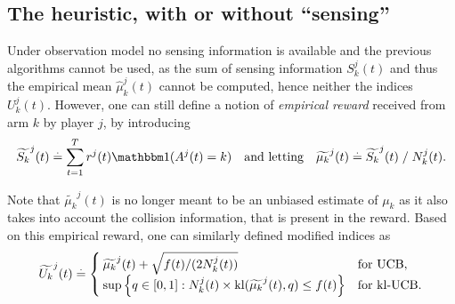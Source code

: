 \subsection{The \Selfish{} heuristic, with or without ``sensing''}
\label{sub:5:Selfish}

Under observation model \modeltrois{} no sensing information is available and the previous algorithms cannot be used, as the sum of sensing information $S_k^j(t)$ and thus the empirical mean $\widehat{\mu}_k^j(t)$ cannot be computed, hence neither the indices $U_k^j(t)$. However, one can still define a notion of \emph{empirical reward} received from arm $k$ by player $j$, by introducing
%
\begin{equation}
  \widetilde{S_k}^j(t) \eqdef \sum_{t=1}^T r^j(t) \indic(A^j(t) = k)
  \ \ \ \text{and letting} \ \ \ \widetilde{\mu_k}^j(t) \eqdef \widetilde{S_k}^j(t) \;/\; N_k^j(t).
\end{equation}

Note that $\widetilde{\mu_k}^j(t)$ is no longer meant to be an unbiased estimate of $\mu_k$ as it also takes into account the collision information, that is present in the reward. Based on this empirical reward, one can similarly defined modified indices as
%
\begin{equation}\label{eq:5:indexTilde}
  \widetilde{U_k}^j(t) \overset{.}{=} \begin{cases}
      \widetilde{\mu_k}^j(t)  + \sqrt{  f(t) / (2N_k^j(t))}
      &\text{for } \mathrm{UCB}, \\
      \sup\left\{ q \in [0, 1]: N_k^j(t)\times \mathrm{kl}(\widetilde{\mu_k}^j(t), q) \leq f(t) \right\}
      &\text{for } \mathrm{kl}\text{-}\mathrm{UCB}.
  \end{cases}
\end{equation}

